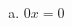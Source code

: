\documentclass[a4paper,14pt]{article}
\begin{document}
\begin{multicols}{2}
\begin{enumerate}
\begin{enumerate}[a)]
    			\item $0x = 0$ \\\\\\\\\\\\\\\\
    		\end{enumerate}
    	\end{enumerate}
    $~$ \\ $~$ \\ $~$ \\ $~$ \\ $~$ \\ $~$ \\ $~$ \\ $~$ \\ $~$ \\ $~$  \\ $~$  \\ $~$  \\ $~$  \\ $~$  \\ $~$  \\ $~$  \\ $~$  \\ $~$ \\ $~$ \\ $~$ \\ $~$ \\ $~$ \\ $~$ \\ $~$ \\ $~$ \\ $~$ \\ $~$ \\ $~$ \\ $~$ \\ $~$ \\ $~$ \\ $~$ \\ $~$ \\ $~$ \\ $~$ \\ $~$ \\ $~$ \\ $~$ \\ $~$ \\ $~$ \\ $~$ \\ $~$ \\ $~$
	\end{multicols}
\end{document}
